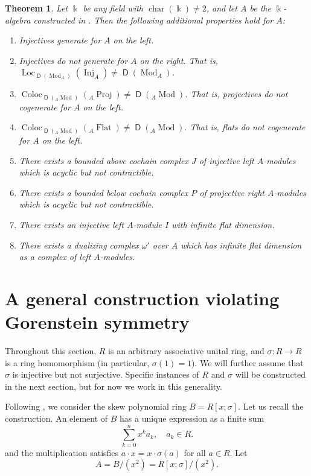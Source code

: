 \documentclass{amsart}
\newtheorem{cthm}{Theorem}
\theoremstyle{definition}
\newcommand{\opn}{\operatorname}
\newcommand{\cat}[1]{\operatorname{\mathsf{#1}}}
\renewcommand{\k}{\Bbbk}
\numberwithin{equation}{section}
\begin{document}
\begin{cthm}
Let $\k$ be any field with $\opn{char}(\k) \ne 2$,
and let $A$ be the $\k$-algebra constructed in .
Then the following additional properties hold for $A$:
\begin{enumerate}
\item Injectives generate for $A$ on the left.
\item Injectives do not generate for $A$ on the right.
That is, $\opn{Loc}_{\cat{D}(\opn{Mod}_A)}(\opn{Inj}_A) \ne \cat{D}(\opn{Mod}_A)$.
\item $\opn{Coloc}_{\cat{D}({}_A \opn{Mod})}({}_A \opn{Proj}) \ne \cat{D}({}_A \opn{Mod})$. 
That is, projectives do not cogenerate for $A$ on the left.
\item $\opn{Coloc}_{\cat{D}({}_A \opn{Mod})}({}_A \opn{Flat}) \ne \cat{D}({}_A \opn{Mod})$. 
That is, flats do not cogenerate for $A$ on the left.
\item There exists a bounded above cochain complex $J$ of injective left $A$-modules which is acyclic but not contractible.
\item There exists a bounded below cochain complex $P$ of projective right $A$-modules which is acyclic but not contractible.
\item There exists an injective left $A$-module $I$ with infinite flat dimension.
\item There exists a dualizing complex $\omega'$ over $A$ which has infinite flat dimension as a complex of left $A$-modules.
\end{enumerate}
\end{cthm}


\section{A general construction violating Gorenstein symmetry}\label{sec:gen}

Throughout this section, $R$ is an arbitrary associative unital ring,
and $\sigma:R \to R$ is a ring homomorphism (in particular, $\sigma(1) = 1$).
We will further assume that $\sigma$ is injective but not surjective.
Specific instances of $R$ and $\sigma$ will be constructed in the next section,
but for now we work in this generality.

Following \cite[Section 1.2.3]{NCBook},
we consider the skew polynomial ring $B = R[x;\sigma]$.
Let us recall the construction.
An element of $B$ has a unique expression as a finite sum
\[
\sum_{k=0}^n x^k a_k, \quad a_k \in R.
\]
and the multiplication satisfies $a\cdot x = x\cdot \sigma(a)$ for all $a \in R$.
Let 
\begin{equation}\label{eqn:hero}
A = B/(x^2) = R[x;\sigma]/(x^2).
\end{equation}
\end{document}
